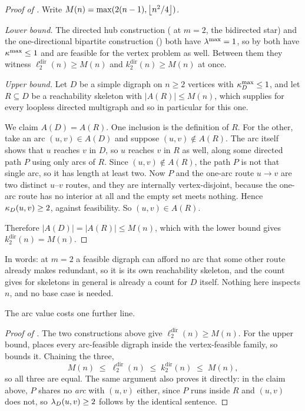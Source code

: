 \begin{proof}[Proof of ]
Write $M(n) = \max(2(n-1), \left\lfloor n^2/4 \right\rfloor)$.

\emph{Lower bound.} The directed hub construction ( at $m = 2$, the bidirected star) and the one-directional bipartite construction () both have $\lambda^{\max} = 1$, so by  both have $\kappa^{\max} \le 1$ and are feasible for the vertex problem as well. Between them they witness $\ell_2^{\mathrm{dir}}(n) \ge M(n)$ and $k_2^{\mathrm{dir}}(n) \ge M(n)$ at once.

\emph{Upper bound.} Let $D$ be a simple digraph on $n \ge 2$ vertices with $\kappa^{\max}_D \le 1$, and let $R \subseteq D$ be a reachability skeleton with $|A(R)| \le M(n)$, which  supplies for every loopless directed multigraph and so in particular for this one.

We claim $A(D) = A(R)$. One inclusion is the definition of $R$. For the other, take an arc $(u,v) \in A(D)$ and suppose $(u,v) \notin A(R)$. The arc itself shows that $u$ reaches $v$ in $D$, so $u$ reaches $v$ in $R$ as well, along some directed path $P$ using only arcs of $R$. Since $(u,v) \notin A(R)$, the path $P$ is not that single arc, so it has length at least two. Now $P$ and the one-arc route $u \to v$ are two distinct $u$--$v$ routes, and they are internally vertex-disjoint, because the one-arc route has no interior at all and the empty set meets nothing. Hence $\kappa_D(u,v) \ge 2$, against feasibility. So $(u,v) \in A(R)$.

Therefore $|A(D)| = |A(R)| \le M(n)$, which with the lower bound gives $k_2^{\mathrm{dir}}(n) = M(n)$.
\end{proof}

In words: at $m = 2$ a feasible digraph can afford no arc that some other route already makes redundant, so it is its own reachability skeleton, and the count  gives for skeletons in general is already a count for $D$ itself. Nothing here inspects $n$, and no base case is needed.

The arc value costs one further line.

\begin{proof}[Proof of ]
The two constructions above give $\ell_2^{\mathrm{dir}}(n) \ge M(n)$. For the upper bound,  places every arc-feasible digraph inside the vertex-feasible family, so  bounds it. Chaining the three,
\[
    M(n) \;\le\; \ell_2^{\mathrm{dir}}(n) \;\le\; k_2^{\mathrm{dir}}(n) \;\le\; M(n),
\]
so all three are equal. The same argument also proves it directly: in the claim above, $P$ shares no \emph{arc} with $(u,v)$ either, since $P$ runs inside $R$ and $(u,v)$ does not, so $\lambda_D(u,v) \ge 2$ follows by the identical sentence.
\end{proof}

